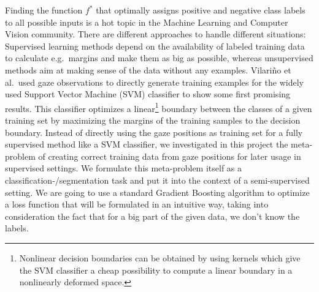 Finding the function $f^*$ that optimally assigns positive and negative class labels to all possible inputs is a hot topic in the Machine Learning and Computer Vision community. 
There are different approaches to handle different situations: Supervised learning methods depend on the availability of labeled training data to calculate e.g.\ margins and make them as big as possible, whereas unsupervised methods aim at making sense of the data without any examples. 
Vilari\~no et al.\ used gaze observations to directly generate training examples for the widely used Support Vector Machine (SVM) classifier to show some first promising results. 
This classifier optimizes a linear\footnote{Nonlinear decision boundaries can be obtained by using kernels which give the SVM classifier a cheap possibility to compute a linear boundary in a nonlinearly deformed space.} boundary between the classes of a given training set by maximizing the margins of the training samples to the decision boundary. Instead of directly using the gaze positions as training set for a fully supervised method like a SVM classifier, we investigated in this project the meta-problem of creating correct training data from gaze positions for later usage in supervised settings. 
We formulate this meta-problem itself as a classification-/segmentation task and put it into the context of a semi-supervised setting. 
We are going to use a standard Gradient Boosting algorithm to optimize a loss function that will be formulated in an intuitive way, taking into consideration the fact that for a big part of the given data, we don't know the labels.

